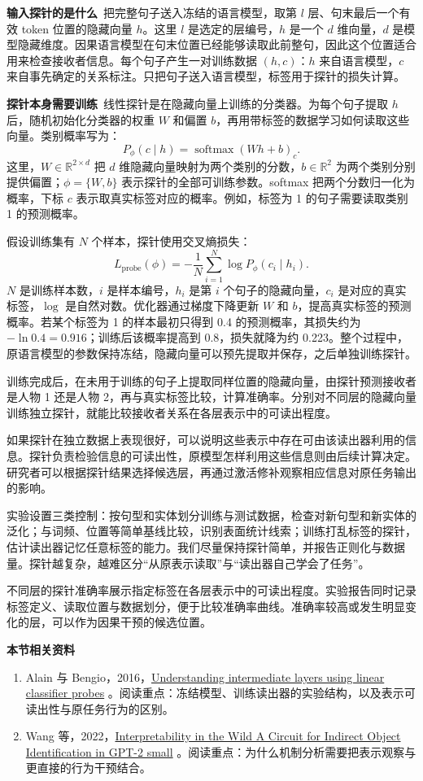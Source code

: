 \textbf{输入探针的是什么}~把完整句子送入冻结的语言模型，取第 $l$ 层、句末最后一个有效 token 位置的隐藏向量 $h$。这里 $l$ 是选定的层编号，$h$ 是一个 $d$ 维向量，$d$ 是模型隐藏维度。因果语言模型在句末位置已经能够读取此前整句，因此这个位置适合用来检查接收者信息。每个句子产生一对训练数据 $(h,c)$：$h$ 来自语言模型，$c$ 来自事先确定的关系标注。只把句子送入语言模型，标签用于探针的损失计算。

\textbf{探针本身需要训练}~线性探针是在隐藏向量上训练的分类器。为每个句子提取 $h$ 后，随机初始化分类器的权重 $W$ 和偏置 $b$，再用带标签的数据学习如何读取这些向量。类别概率写为：
\[
P_\phi(c\mid h)=\operatorname{softmax}(Wh+b)_c.
\]
这里，$W\in\mathbb R^{2\times d}$ 把 $d$ 维隐藏向量映射为两个类别的分数，$b\in\mathbb R^2$ 为两个类别分别提供偏置；$\phi=\{W,b\}$ 表示探针的全部可训练参数。softmax 把两个分数归一化为概率，下标 $c$ 表示取真实标签对应的概率。例如，标签为 1 的句子需要读取类别 1 的预测概率。

假设训练集有 $N$ 个样本，探针使用交叉熵损失：
\[
L_{\mathrm{probe}}(\phi)
=-\frac{1}{N}\sum_{i=1}^{N}\log P_\phi(c_i\mid h_i).
\]
$N$ 是训练样本数，$i$ 是样本编号，$h_i$ 是第 $i$ 个句子的隐藏向量，$c_i$ 是对应的真实标签，$\log$ 是自然对数。优化器通过梯度下降更新 $W$ 和 $b$，提高真实标签的预测概率。若某个标签为 1 的样本最初只得到 0.4 的预测概率，其损失约为 $-\ln0.4=0.916$；训练后该概率提高到 0.8，损失就降为约 0.223。整个过程中，原语言模型的参数保持冻结，隐藏向量可以预先提取并保存，之后单独训练探针。

训练完成后，在未用于训练的句子上提取同样位置的隐藏向量，由探针预测接收者是人物 1 还是人物 2，再与真实标签比较，计算准确率。分别对不同层的隐藏向量训练独立探针，就能比较接收者关系在各层表示中的可读出程度。

如果探针在独立数据上表现很好，可以说明这些表示中存在可由该读出器利用的信息。探针负责检验信息的可读出性，原模型怎样利用这些信息则由后续计算决定。研究者可以根据探针结果选择候选层，再通过激活修补观察相应信息对原任务输出的影响。

实验设置三类控制：按句型和实体划分训练与测试数据，检查对新句型和新实体的泛化；与词频、位置等简单基线比较，识别表面统计线索；训练打乱标签的探针，估计读出器记忆任意标签的能力。我们尽量保持探针简单，并报告正则化与数据量。探针越复杂，越难区分``从原表示读取''与``读出器自己学会了任务''。

不同层的探针准确率展示指定标签在各层表示中的可读出程度。实验报告同时记录标签定义、读取位置与数据划分，便于比较准确率曲线。准确率较高或发生明显变化的层，可以作为因果干预的候选位置。

\textbf{本节相关资料}
\begin{enumerate}
    \item Alain 与 Bengio，2016，\href{https://arxiv.org/abs/1610.01644}{Understanding intermediate layers using linear classifier probes} 。阅读重点：冻结模型、训练读出器的实验结构，以及表示可读出性与原任务行为的区别。
    \item Wang 等，2022，\href{https://arxiv.org/abs/2211.00593}{Interpretability in the Wild A Circuit for Indirect Object Identification in GPT-2 small} 。阅读重点：为什么机制分析需要把表示观察与更直接的行为干预结合。
\end{enumerate}

